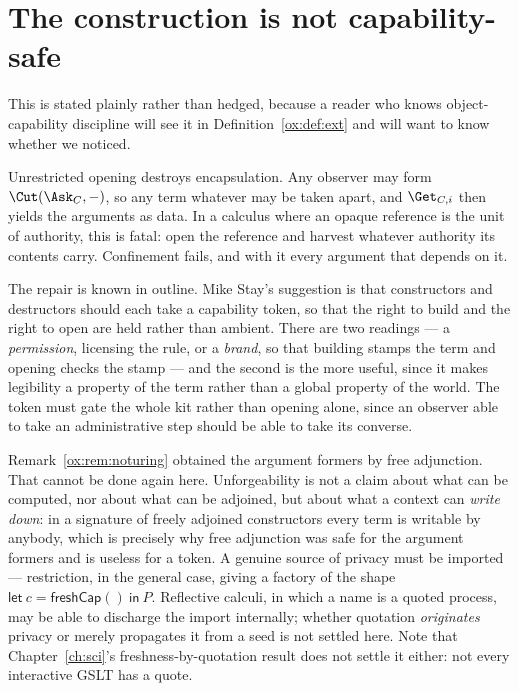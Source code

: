 \section{The construction is not capability-safe}
\label{ox:sec:security}

This is stated plainly rather than hedged, because a reader who knows
object-capability discipline will see it in Definition~\ref{ox:def:ext} and will
want to know whether we noticed.

Unrestricted opening destroys encapsulation. Any observer may form
$\Cut(\Ask_C,-)$, so any term whatever may be taken apart, and $\Get_{C,i}$ then
yields the arguments as data. In a calculus where an opaque reference is the unit of
authority, this is fatal: open the reference and harvest whatever authority its
contents carry. Confinement fails, and with it every argument that depends on it.

The repair is known in outline. Mike Stay's suggestion is that constructors and
destructors should each take a capability token, so that the right to build and the
right to open are held rather than ambient. There are two readings --- a
\emph{permission}, licensing the rule, or a \emph{brand}, so that building stamps
the term and opening checks the stamp --- and the second is the more useful, since
it makes legibility a property of the term rather than a global property of the
world. The token must gate the whole kit rather than opening alone, since an
observer able to take an administrative step should be able to take its converse.

\begin{remark}
\label{ox:rem:import}
Remark~\ref{ox:rem:noturing} obtained the argument formers by free adjunction. That
cannot be done again here. Unforgeability is not a claim about what can be computed,
nor about what can be adjoined, but about what a context can \emph{write down}: in
a signature of freely adjoined constructors every term is writable by anybody, which
is precisely why free adjunction was safe for the argument formers and is useless
for a token. A genuine source of privacy must be imported --- restriction, in the
general case, giving a factory of the shape
$\mathsf{let}\ c = \mathsf{freshCap}()\ \mathsf{in}\ P$. Reflective calculi, in
which a name is a quoted process, may be able to discharge the import internally;
whether quotation \emph{originates} privacy or merely propagates it from a seed is
not settled here. Note that Chapter~\ref{ch:sci}'s freshness-by-quotation result
does not settle it either: not every interactive GSLT has a quote.
\end{remark}

